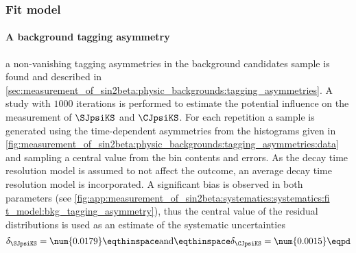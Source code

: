 \subsubsection{Fit model}
\label{sec:measurement_of_sin2beta:systematics:systematics:fit_model}

\paragraph{A background tagging asymmetry} \ie a non-vanishing tagging
asymmetries in the background candidates sample is found and described in
\cref{sec:measurement_of_sin2beta:physic_backgrounds:tagging_asymmetries}. A
\ToyMC study with $\num{1000}$ iterations is performed to estimate the potential
influence on the measurement of $\SJpsiKS$ and $\CJpsiKS$. For each repetition a
sample is generated using the time-dependent asymmetries from the histograms
given in \cref{fig:measurement_of_sin2beta:physic_backgrounds:tagging_asymmetries:data}
and sampling a central value from the bin contents and errors. As the decay time
resolution model is assumed to not affect the outcome, an average decay time
resolution model is incorporated. A significant bias is observed in both \CP
parameters (see \cref{fig:app:measurement_of_sin2beta:systematics:systematics:fi
t_model:bkg_tagging_asymmetry}), thus the central value of the residual
distributions is used as an estimate of the systematic uncertainties
%
\begin{equation}
  \delta_{\SJpsiKS} = \num{0.0179}\eqthinspace\text{and}\eqthinspace\delta_{\CJpsiKS} = \num{0.0015}\eqpd
\end{equation}


